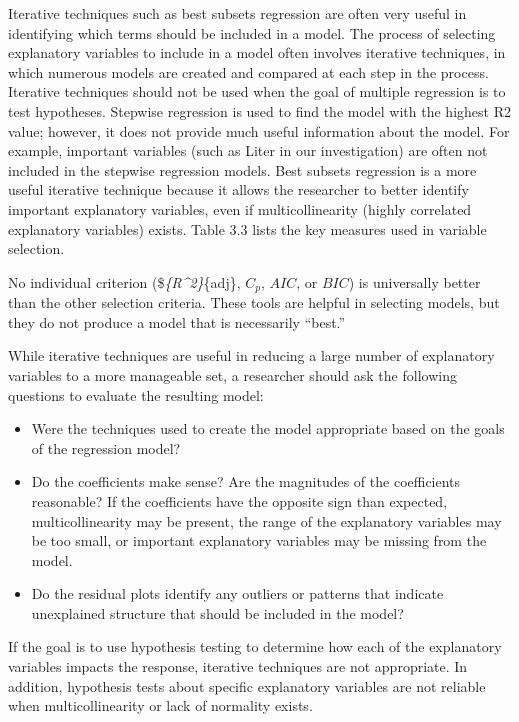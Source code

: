 \documentclass[
]{report}
\providecommand{\tightlist}{%
  \setlength{\itemsep}{0pt}\setlength{\parskip}{0pt}}
\theoremstyle{definition}
\theoremstyle{definition}
\theoremstyle{definition}
\theoremstyle{definition}
\theoremstyle{remark}
\begin{document}
Iterative techniques such as best subsets regression are often very useful in identifying which terms should be included in a model. The process of selecting explanatory variables to include in a model often involves iterative techniques, in which numerous models are created and compared at each step in the process. Iterative techniques should not be used when the goal of multiple regression is to test hypotheses. Stepwise regression is used to find the model with the highest R2 value; however, it does not provide much useful information about the model. For example, important variables (such as Liter in our investigation) are often not included in the stepwise regression models. Best subsets regression is a more useful iterative technique
because it allows the researcher to better identify important explanatory variables, even if multicollinearity (highly correlated explanatory variables) exists. Table 3.3 lists the key measures used in variable selection.

No individual criterion (\$\emph{\{R\^{}2\}}\{adj\}, \(C_p\), \(AIC\), or \(BIC\)) is universally better than the other selection criteria. These tools are helpful in selecting models, but they do not produce a model that is necessarily ``best.''

While iterative techniques are useful in reducing a large number of explanatory variables to a more manageable set, a researcher should ask the following questions to evaluate the resulting model:

\begin{itemize}
\tightlist
\item
  Were the techniques used to create the model appropriate based on the goals of the regression model?
\item
  Do the coefficients make sense? Are the magnitudes of the coefficients reasonable? If the coefficients have the opposite sign than expected, multicollinearity may be present, the range of the explanatory variables may be too small, or important explanatory variables may be missing from the model.
\item
  Do the residual plots identify any outliers or patterns that indicate unexplained structure that should be included in the model?
\end{itemize}

If the goal is to use hypothesis testing to determine how each of the explanatory variables impacts the response, iterative techniques are not appropriate. In addition, hypothesis tests about specific explanatory variables are not reliable when multicollinearity or lack of normality exists.
\end{document}

